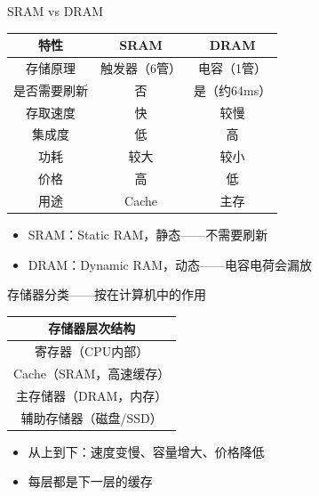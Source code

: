 \documentclass[10pt, aspectratio=169]{beamer}
\begin{document}
\begin{frame}{SRAM vs DRAM}
    \begin{center}
        \begin{tabular}{|c|c|c|}
            \hline
            \textbf{特性} & \textbf{SRAM} & \textbf{DRAM} \\
            \hline
            存储原理 & 触发器（6管） & 电容（1管） \\
            \hline
            是否需要刷新 & 否 & 是（约64ms） \\
            \hline
            存取速度 & 快 & 较慢 \\
            \hline
            集成度 & 低 & 高 \\
            \hline
            功耗 & 较大 & 较小 \\
            \hline
            价格 & 高 & 低 \\
            \hline
            用途 & Cache & 主存 \\
            \hline
        \end{tabular}
    \end{center}
    \vspace{0.3em}
    \begin{itemize}
        \item SRAM：Static RAM，静态——不需要刷新
        \item DRAM：Dynamic RAM，动态——电容电荷会漏放
    \end{itemize}
\end{frame}

\begin{frame}{存储器分类——按在计算机中的作用}
    \begin{center}
        \begin{tabular}{c}
            \textbf{存储器层次结构} \\
            \hline
            寄存器（CPU内部） \\
            \hline
            Cache（SRAM，高速缓存） \\
            \hline
            主存储器（DRAM，内存） \\
            \hline
            辅助存储器（磁盘/SSD） \\
            \hline
        \end{tabular}
    \end{center}
    \vspace{0.5em}
    \begin{itemize}
        \item 从上到下：速度变慢、容量增大、价格降低
        \item 每层都是下一层的缓存
    \end{itemize}
\end{frame}
\end{document}
